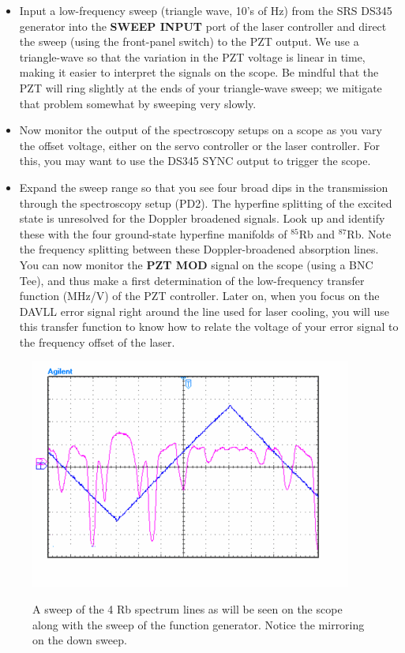 \documentclass{../lab}
\begin{document}
\begin{itemize}
    \item Input a low-frequency sweep (triangle wave, 10’s of Hz) from the SRS DS345 generator into the \textbf{SWEEP INPUT} port of the laser controller and direct the sweep (using the front-panel switch) to the PZT output. We use a triangle-wave so that the variation in the PZT voltage is linear in time, making it easier to interpret the signals on the scope. Be mindful that the PZT will ring slightly at the ends of your triangle-wave sweep; we mitigate that problem somewhat by sweeping very slowly.

    \item Now monitor the output of the spectroscopy setups on a scope as you vary the offset voltage, either on the servo controller or the laser controller. For this, you may want to use the DS345 SYNC output to trigger the scope.

    \item Expand the sweep range so that you see four broad dips in the transmission through the spectroscopy setup (PD2). The hyperfine splitting of the excited state is unresolved for the Doppler broadened signals. Look up \cite{BSCWriteup,Steck} and identify these with the four ground-state hyperfine manifolds of $^{85}$Rb and $^{87}$Rb. Note the frequency splitting between these Doppler-broadened absorption lines. You can now monitor the \textbf{PZT MOD} signal on the scope (using a BNC Tee), and thus make a first determination of the low-frequency transfer function (MHz/V) of the PZT controller.  Later on, when you focus on the DAVLL error signal right around the line used for laser cooling, you will use this transfer function to know how to relate the voltage of your error signal to the frequency offset of the laser.
\end{itemize}

\begin{figure}[h]
    \centering
    \href{http://experimentationlab.berkeley.edu/sites/default/files/images/400px-RbSpecMOT.GIF}{\includegraphics[width=0.5\linewidth]{images/400px-RbSpecMOT.png}}
    \caption{A sweep of the 4 Rb spectrum lines as will be seen on the scope along with the sweep of the function generator. Notice the mirroring on the down sweep.}
    \label{fig:400px-RbSpecMOT}
\end{figure}
\end{document}
